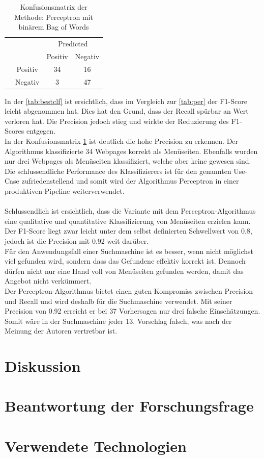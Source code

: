 \begin{table}[H]
	\caption{Konfusionsmatrix der Methode: Perceptron mit binärem Bag of Words}
	\centering
	\label{tab:conf}
	\begin{tabular}{@{}cc|cc@{}}
		\multicolumn{1}{c}{} &\multicolumn{1}{c}{} &\multicolumn{2}{c}{Predicted} \\ 
		\multicolumn{1}{c}{} & 
		\multicolumn{1}{c|}{} & 
		\multicolumn{1}{c}{Positiv} & 
		\multicolumn{1}{c}{Negativ} \\ 
		\cline{2-4}
		\multirow[c]{2}{*}{\rotatebox[origin=tr]{90}{Actual}}
		& Positiv  & 34   & 16   \\[1.5ex]
		& Negativ  & 3   & 47 \\ 
		\cline{2-4}
	\end{tabular}
\end{table}
In der \cref{tab:bestclf} ist ersichtlich, dass im Vergleich zur \cref{tab:per} der F1-Score leicht abgenommen hat.
Dies hat den Grund, dass der Recall spürbar an Wert verloren hat.
Die Precision jedoch stieg und wirkte der Reduzierung des F1-Scores entgegen.\\
In der Konfusionsmatrix \cref{tab:conf} ist deutlich die hohe Precision zu erkennen.
Der Algorithmus klassifizierte 34 Webpages korrekt als Menüseiten.
Ebenfalls wurden nur drei Webpages als Menüseiten klassifiziert, welche aber keine gewesen sind.
Die schlussendliche Performance des Klassifizierers ist für den genannten \glqq Use-Case\grqq{} zufriedenstellend und somit wird der Algorithmus Perceptron in einer produktiven Pipeline weiterverwendet.
\\\\
Schlussendlich ist ersichtlich, dass die Variante mit dem Perceptron-Algorithmus eine qualitative und quantitative Klassifizierung von Menüseiten erzielen kann.
Der F1-Score liegt zwar leicht unter dem selbst definierten Schwellwert von 0.8, jedoch ist die Precision mit 0.92 weit darüber.\\

Für den Anwendungsfall einer Suchmaschine ist es besser, wenn nicht möglichst viel gefunden wird, sondern dass das Gefundene effektiv korrekt ist.
Dennoch dürfen nicht nur eine Hand voll von Menüseiten gefunden werden, damit das Angebot nicht verkümmert.\\
Der Perceptron-Algorithmus bietet einen guten Kompromiss zwischen Precision und Recall und wird deshalb für die Suchmaschine verwendet.
Mit seiner Precision von 0.92 erreicht er bei 37 Vorhersagen nur drei falsche Einschätzungen.
Somit wäre in der Suchmaschine jeder 13. Vorschlag falsch, was nach der Meinung der Autoren vertretbar ist.
\section{Diskussion}
\section{Beantwortung der Forschungsfrage}
\section{Verwendete Technologien}